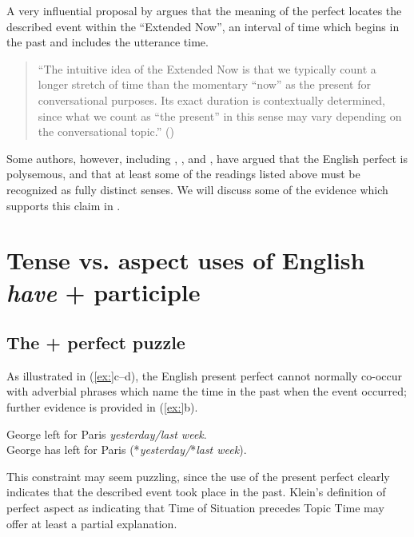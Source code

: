 A very influential proposal by \citet{McCoard1978} argues that the meaning of the perfect locates the described event within the “Extended Now”, an interval of time which begins in the past and includes the utterance time.


\begin{quote}
“The intuitive idea of the Extended Now is that we typically count a longer stretch of time than the momentary “now” as the present for conversational purposes. Its exact duration is contextually determined, since what we count as “the present” in this sense may vary depending on the conversational topic.” (\citealt{Portner2003}) 
\end{quote}


Some authors, however, including \citet{McCawley1971,McCawley1981b}, \citet{Michaelis1994,Michaelis1998}, and \citet{Kiparsky2002}, have argued that the English perfect is polysemous, and that at least some of the readings listed above must be recognized as fully distinct senses. We will discuss some of the evidence which supports this claim in .


\section{Tense vs. aspect uses of English \textit{have} + participle}\label{sec:22.3}
\subsection{The + perfect puzzle}\footnotemark{}\label{sec:22.3.1}

As illustrated in (\ref{ex:}c--d), the English present perfect cannot normally co-occur with adverbial phrases which name the time in the past when the event occurred; further evidence is provided in (\ref{ex:}b).


\ea
\ea George left for Paris \textit{yesterday/last week}.\\
\ex George has left for Paris (*\textit{yesterday/}*\textit{last week}).
                       \z
\z


This constraint may seem puzzling, since the use of the present perfect clearly indicates that the described event took place in the past. Klein’s definition of perfect aspect as indicating that Time of Situation precedes Topic Time may offer at least a partial explanation. 



